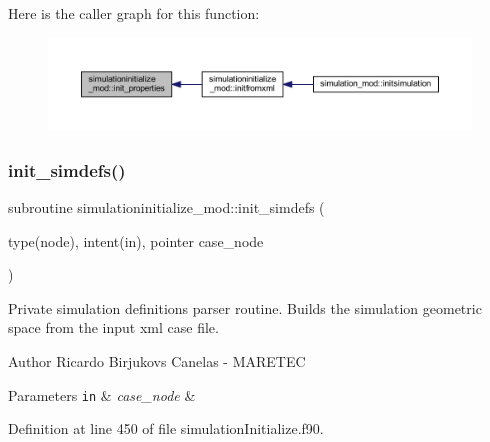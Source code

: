 Here is the caller graph for this function\+:\nopagebreak
\begin{figure}[H]
\begin{center}
\leavevmode
\includegraphics[width=350pt]{namespacesimulationinitialize__mod_a532cb4960e93dc27cff5dc2e04afe070_icgraph}
\end{center}
\end{figure}
\mbox{\label{namespacesimulationinitialize__mod_af6b2508d52e9e29aeb6e7dfbabd88e8d}} 
\subsubsection{\texorpdfstring{init\+\_\+simdefs()}{init\_simdefs()}}
{\footnotesize\ttfamily subroutine simulationinitialize\+\_\+mod\+::init\+\_\+simdefs (\begin{DoxyParamCaption}\item[{type(node), intent(in), pointer}]{case\+\_\+node }\end{DoxyParamCaption})\hspace{0.3cm}{\ttfamily [private]}}



Private simulation definitions parser routine. Builds the simulation geometric space from the input xml case file. 

\begin{DoxyAuthor}{Author}
Ricardo Birjukovs Canelas -\/ M\+A\+R\+E\+T\+EC 
\end{DoxyAuthor}

\begin{DoxyParams}[1]{Parameters}
\mbox{\tt in}  & {\em case\+\_\+node} & \\
\hline
\end{DoxyParams}


Definition at line 450 of file simulation\+Initialize.\+f90.


